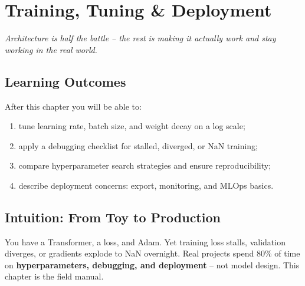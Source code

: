 \chapter{Training, Tuning \& Deployment}\label{ch:training}
\begin{center}\small\textit{Architecture is half the battle -- the rest is making it actually work and stay working in the real world.}\end{center}

\noindent{}
\vspace{0.3em}
\section*{Learning Outcomes}
After this chapter you will be able to:
\begin{enumerate}[label=(L\arabic*)]
    \item tune learning rate, batch size, and weight decay on a log scale;
    \item apply a debugging checklist for stalled, diverged, or NaN training;
    \item compare hyperparameter search strategies and ensure reproducibility;
    \item describe deployment concerns: export, monitoring, and MLOps basics.
\end{enumerate}

\section{Intuition: From Toy to Production}
You have a Transformer, a loss, and Adam. Yet training loss stalls, validation diverges, or gradients explode to NaN overnight. Real projects spend 80\% of time on \textbf{hyperparameters, debugging, and deployment} -- not model design. This chapter is the field manual.


